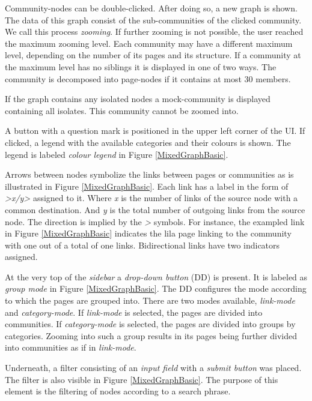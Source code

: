Community-nodes can be double-clicked. After doing so, a new graph is shown. The data of this graph consist of the sub-communities of the clicked community. We call this process \textit{zooming}. If further zooming is not possible, the user reached the maximum zooming level. Each community may have a different maximum level, depending on the number of its pages and its structure. If a community at the maximum level has no siblings it is displayed in one of two ways. The community is decomposed into page-nodes if it contains at most 30 members.

If the graph contains any isolated nodes a mock-community is displayed containing all isolates. This community cannot be zoomed into. 

A button with a question mark is positioned in the upper left corner of the UI. If clicked, a legend with the available categories and their colours is shown. The legend is labeled \textit{colour legend} in Figure \ref{MixedGraphBasic}.

Arrows between nodes symbolize the links between pages or communities as is illustrated in Figure \ref{MixedGraphBasic}. Each link has a label in the form of \textit{>x/y>} assigned to it. Where \textit{x} is the number of links of the source node with a common destination. And \textit{y} is the total number of outgoing links from the source node. The direction is implied by the \textit{>} symbols. For instance, the exampled link in Figure \ref{MixedGraphBasic} indicates the lila page linking to the community with one out of a total of one links. Bidirectional links have two indicators assigned.

At the very top of the \textit{sidebar} a \textit{drop-down button} (DD) is present. It is labeled as \textit{group mode} in Figure \ref{MixedGraphBasic}. The DD configures the mode according to which the pages are grouped into. There are two modes available, \textit{link-mode} and \textit{category-mode}. If \textit{link-mode} is selected, the pages are divided into communities. If \textit{category-mode} is selected, the pages are divided into groups by categories. Zooming into such a group results in its pages being further divided into communities as if in \textit{link-mode}. 

Underneath, a filter consisting of an \textit{input field} with a \textit{submit button} was placed. The filter is also visible in Figure \ref{MixedGraphBasic}. The purpose of this element is the filtering of nodes according to a search phrase.

